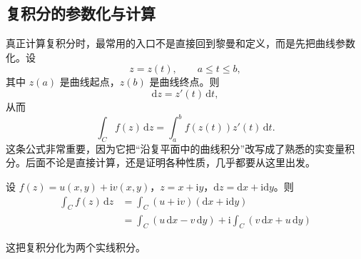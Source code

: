 \subsection{复积分的参数化与计算}

真正计算复积分时，最常用的入口不是直接回到黎曼和定义，而是先把曲线参数化。设
\[
    z=z(t),\qquad a\le t\le b,
\]
其中 $z(a)$ 是曲线起点，$z(b)$ 是曲线终点。则
\[
    \mathrm{d}z = z'(t)\,\mathrm{d}t,
\]
从而
\[
    \int_C f(z)\,\mathrm{d}z = \int_a^b f(z(t))z'(t)\,\mathrm{d}t.
\]
这条公式非常重要，因为它把``沿复平面中的曲线积分''改写成了熟悉的实变量积分。后面不论是直接计算，还是证明各种性质，几乎都要从这里出发。

设 $f(z) = u(x, y) + \mathrm{i}v(x, y)$，$z = x + \mathrm{i}y$，$\mathrm{d}z = \mathrm{d}x + \mathrm{i}\mathrm{d}y$。则
\begin{align}
    \int_C f(z)\,\mathrm{d}z &= \int_C (u + \mathrm{i}v)(\mathrm{d}x + \mathrm{i}\mathrm{d}y) \\
    &= \int_C (u\,\mathrm{d}x - v\,\mathrm{d}y) + \mathrm{i}\int_C (v\,\mathrm{d}x + u\,\mathrm{d}y)
\end{align}

这把复积分化为两个实线积分。

